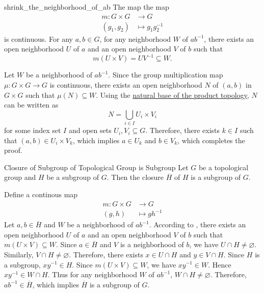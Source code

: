 \documentclass{report}
\begin{document}
\begin{lemma}{}{shrink_the_neighborhood_of_ab}
	The map the map
	\begin{align*}
		m:G\times G & \longrightarrow G       \\
		(g_1,g_2)   & \longmapsto g_1g_2^{-1}
	\end{align*}
	is continuous. For any $a ,b\in G$, for any neighborhood $W$ of $ab^{-1}$, there exists an open neighborhood $U$ of $a$ and an open neighborhood $V$ of $b$ such that 
	\[
	m(U\times V)=U V^{-1}\subseteq W.
	\]
\end{lemma}
\begin{prf}
	Let $W$ be a neighborhood of $ab^{-1}$. Since the group multiplication map $\mu:G\times G\to G$ is continuous, there exists an open neighborhood $N$ of $(a,b)$ in $G\times G$ such that $\mu(N)\subseteq W$. Using the \hyperref[th:basis_of_product_topology]{natural base of the product topology}, $N$ can be written as 
	\[
	N=\bigcup_{i\in I} U_i\times V_i
	\]
	for some index set $I$ and open sets $U_i, V_i\subseteq G$. Therefore, there exists $k\in I$ such that $(a,b)\in U_i\times V_k$, which implies $a\in U_k$ and $b\in V_k$, which completes the proof.
\end{prf}

\begin{proposition}{Closure of Subgroup of Topological Group is Subgroup}{}
	Let $G$ be a topological group and $H$ be a subgroup of $G$. Then the closure $\overline{H}$ of $H$ is a subgroup of $G$.
\end{proposition}
\begin{prf}
	 Define a continous map 
	\begin{align*}
		m:G\times G & \longrightarrow G \\
		(g,h)         & \longmapsto gh^{-1}
	\end{align*}
	Let $a,b\in \overline{H}$ and $W$ be a neighborhood of $ab^{-1}$. According to , there exists an open neighborhood $U$ of $a$ and an open neighborhood $V$ of $b$ such that $m(U\times V)\subseteq W$. Since $a \in \overline{H}$ and $V$ is a neighborhood of $b$, we have $U\cap H\ne \varnothing$. Similarly, $V\cap H\ne \varnothing$. Therefore, there exists $x\in U \cap H$ and $y\in V\cap H$. Since $H$ is a subgroup, $xy^{-1}\in H$. Since $m(U\times V)\subseteq W$, we have $xy^{-1}\in W$. Hence $xy^{-1}\in W\cap H$.
	Thus for any neighborhood $W$ of $ab^{-1}$, $W\cap H\ne \varnothing$. Therefore, $ab^{-1}\in \overline{H}$, which implies $\overline{H}$ is a subgroup of $G$.
\end{prf}
\end{document}
